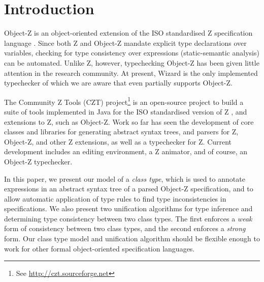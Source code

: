 \section{Introduction}

Object-Z \cite{smith00} is an object-oriented extension of the ISO
standardised Z specification language \cite{isoz}. Since both Z
and Object-Z mandate explicit type declarations over variables,
checking for type consistency over expressions (static-semantic
analysis) can be automated. Unlike Z, however, typechecking Object-Z
has been given little attention in the research community.  At
present, Wizard \cite{johnston96} is the only implemented typechecker
of which we are aware that even partially supports Object-Z.

The Community Z Tools (CZT) project\footnote{See
\url{http://czt.sourceforge.net}} is an open-source project to build a
suite of tools implemented in Java for the ISO standardised version of
Z \cite{isoz}, and extensions to Z, such as Object-Z. Work so far has
seen the development of core classes and libraries for generating
abstract syntax trees, and parsers for Z, Object-Z, and other Z
extensions, as well as a typechecker for Z. Current development
includes an editing environment, a Z animator, and of course, an
Object-Z typechecker.

In this paper, we present our model of a {\em class type}, which is
used to annotate expressions in an abstract syntax tree of a parsed
Object-Z specification, and to allow automatic application of type
rules to find type inconsistencies in specifications. We also present
two unification algorithms for type inference and determining type
consistency between two class types. The first enforces a {\em weak}
form of consistency between two class types, and the second enforces a
{\em strong} form. Our class type model and unification algorithm
should be flexible enough to work for other formal object-oriented
specification languages.
